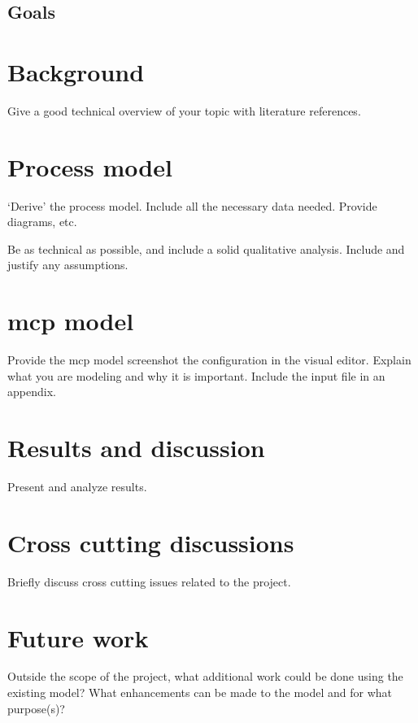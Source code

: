 \documentclass[11pt,a4paper]{article}
\newcommand{\acs}{\acrshort} %
\begin{document}
\subsection{Goals}


\newpage


\section{Background} \label{sec-background}
Give a good technical overview of your topic with literature references.


\newpage


\section{Process model} \label{sec-process-model}
`Derive' the process model. Include all the necessary data needed. Provide diagrams, etc.

Be as technical as possible, and include a solid qualitative analysis. Include and justify any assumptions.


\newpage


\section{\acs{mcp} model} \label{sec-mcnp}
Provide the \acs{mcp} model screenshot the configuration in the visual editor. Explain what you are modeling and why it is important. Include the input file in an appendix.


\newpage


\section{Results and discussion} \label{sec-results-discussion}
Present and analyze results.


\newpage


\section{Cross cutting discussions} \label{sec-cross-cutting}
Briefly discuss cross cutting issues related to the project.


\newpage


\section{Future work} \label{sec-future-work}
Outside the scope of the project, what additional work could be done using the existing model? What enhancements can be made to the model and for what purpose(s)?
\end{document}

